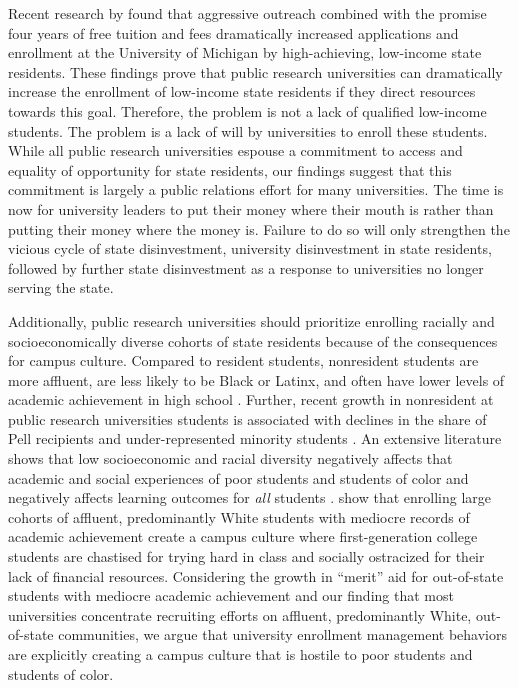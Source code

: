 \documentclass[twoside]{article}
\begin{document}
Recent research by \cite{RN4408} found that aggressive outreach combined with the promise four years of free tuition and fees dramatically increased applications and enrollment at the University of Michigan by high-achieving, low-income state residents.  These findings prove that public research universities can dramatically increase the enrollment of low-income state residents if they direct resources towards this goal. Therefore, the problem is not a lack of qualified low-income students. The problem is a lack of will by universities to enroll these students. While all public research universities espouse a commitment to access and equality of opportunity for state residents, our findings suggest that this commitment is largely a public relations effort for many universities. The time is now for university leaders to put their money where their mouth is rather than putting their money where the money is.  Failure to do so will only strengthen the vicious cycle of state disinvestment, university disinvestment in state residents, followed by further state disinvestment as a response to universities no longer serving the state.

Additionally, public research universities should prioritize enrolling racially and socioeconomically diverse cohorts of state residents because of the consequences for campus culture. Compared to resident students, nonresident students are more affluent, are less likely to be Black or Latinx, and often have lower levels of academic achievement in high school \citep{RN3685}.  Further, recent growth in nonresident at public research universities students is associated with declines in the share of Pell recipients and under-represented minority students \citep{RN3685}.  An extensive literature shows that low socioeconomic and racial diversity negatively affects that academic and social experiences of poor students and students of color \citep[e.g., ][]{RN3205,RN3193,RN3639,RN3185} and negatively affects learning outcomes for \textit{all} students \citep[e.g., ][]{RN3026,RN2576,RN3153,RN3174}. \cite{RN4231} show that enrolling large cohorts of affluent, predominantly White students with mediocre records of academic achievement create a campus culture where first-generation college students are chastised for trying hard in class and socially ostracized for their lack of financial resources.  Considering the growth in ``merit'' aid for out-of-state students with mediocre academic achievement \citep[e.g., ][]{RN4032,RN4409,RN3762} and our finding that most universities concentrate recruiting efforts on affluent, predominantly White, out-of-state communities, we argue that university enrollment management behaviors are explicitly creating a campus culture that is hostile to poor students and students of color.
\end{document}
